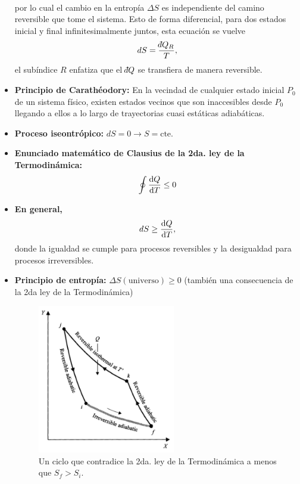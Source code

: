 \begin{itemize}
\begin{align}
\end{align}
por lo cual el cambio en la entropía $\Delta S$ es independiente
del camino reversible que tome el sistema. Esto de forma diferencial,
para dos estados inicial y final infinitesimalmente juntos, esta ecuación 
se vuelve
\begin{align}
dS=\frac{\dbar Q_R}{T},
\end{align}
el subíndice $R$ enfatiza que el $\dbar Q$ se transfiera de manera 
reversible.
\item \textbf{Principio de Carathéodory:} 
En la vecindad de cualquier estado inicial $P_0$ de un sistema
físico, existen estados vecinos que son inaccesibles desde $P_0$ 
llegando a ellos a lo largo de trayectorias cuasi estáticas adiabáticas.
\item \textbf{Proceso iseontrópico:} $dS=0\rightarrow S=\text{cte.}$
\item \textbf{Enunciado matemático de Clausius de la 
2da. ley de la Termodinámica:}
\begin{align}
\oint \dv{Q}{T}\leq 0
\end{align}
\item \textbf{En general,}
\begin{align}
dS \geq \dv{Q}{T},
\label{eq:general-dS}
\end{align}
donde la igualdad se cumple para procesos reversibles y la
desigualdad para procesos irreversibles. 
\item \textbf{Principio de entropía:} $\Delta S(\text{universo})\geq0$ 
(también una consecuencia de la 2da ley de la Termodinámica)
\begin{figure}
  \centering
  \includegraphics[width=6cm]{images/entropy-principle.png}
  \caption{Un ciclo que contradice la 2da. ley de la Termodinámica
  a menos que $S_f>S_i$.}
  \label{fig:reversible-paths}
\end{figure}
\end{itemize}
































